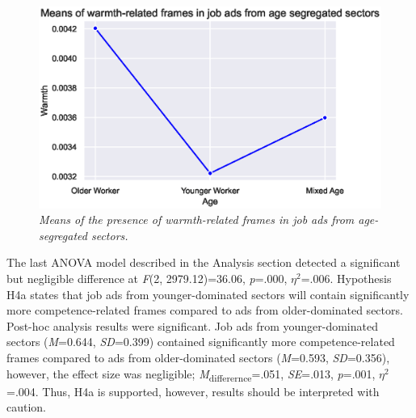 \documentclass[Royal,sageapa,times]{sagej}
\begin{document}
\begin{figure}[ht]
    \setlength{\fboxsep}{0pt}%
    \setlength{\fboxrule}{0pt}%
    \begin{center}
    \includegraphics[width=\textwidth]{FT/Figure3.eps}
    \end{center}
    \caption{\textit{Means of the presence of warmth-related frames in job ads from age-segregated sectors.}}
    \label{figure3}
    \end{figure}

The last ANOVA model described in the Analysis section detected a significant but negligible difference at \textit{F}(2, 2979.12)=36.06, \textit{p}=.000, \textit{$\eta^2$}=.006. Hypothesis H4a states that job ads from younger-dominated sectors will contain significantly more competence-related frames compared to ads from older-dominated sectors. Post-hoc analysis results were significant. Job ads from younger-dominated sectors (\textit{M}=0.644, \textit{SD}=0.399) contained significantly more competence-related frames compared to ads from older-dominated sectors (\textit{M}=0.593, \textit{SD}=0.356), however, the effect size was negligible; \textit{M}\textsubscript{differernce}=.051, \textit{SE}=.013, \textit{p}=.001, \textit{$\eta^2$}=.004. Thus, H4a is supported, however, results should be interpreted with caution.
\end{document}
